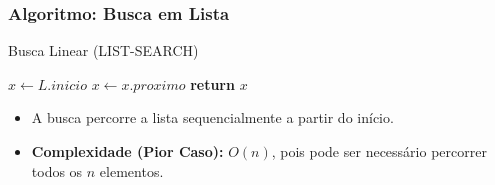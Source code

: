 \documentclass{beamer}
\begin{document}
\begin{frame}[fragile]
\frametitle{Algoritmo: Busca em Lista}
\begin{block}{Busca Linear (LIST-SEARCH)}
\begin{algorithmic}[1]
    \State $x \gets L.inicio$ 
        \State $x \gets x.proximo$ 
    \EndWhile
    \State \textbf{return} $x$ 
\EndProcedure
\end{algorithmic}
\end{block}
\vfill
\begin{itemize}
    \item A busca percorre a lista sequencialmente a partir do início.
    \item \textbf{Complexidade (Pior Caso):} $O(n)$, pois pode ser necessário percorrer todos os $n$ elementos.
\end{itemize}
\end{frame}
\end{document}
